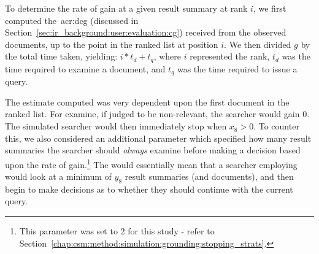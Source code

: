 To determine the rate of gain at a given result summary at rank $i$, we first computed the~\gls{acr:dcg} (discussed in Section~\ref{sec:ir_background:user:evaluation:cg}) received from the observed documents, up to the point in the ranked list at position $i$. We then divided $g$ by the total time taken, yielding: $i * t_d + t_q$, where $i$ represented the rank, $t_d$ was the time required to examine a document, and $t_q$ was the time required to issue a query.

The estimate computed was very dependent upon the first document in the ranked list. For examine, if judged to be non-relevant, the searcher would gain $0$. The simulated searcher would then immediately stop when $x_8 > 0$. To counter this, we also considered an additional parameter which specified how many result summaries the searcher should \emph{always} examine before making a decision based upon the rate of gain.\footnote{This parameter was set to 2 for this study - refer to Section~\ref{chap:csm:method:simulation:grounding:stopping_strats}.} The would essentially mean that a searcher employing  would look at a minimum of $y_8$ result summaries (and documents), and then begin to make decisions as to whether they should continue with the current query.

